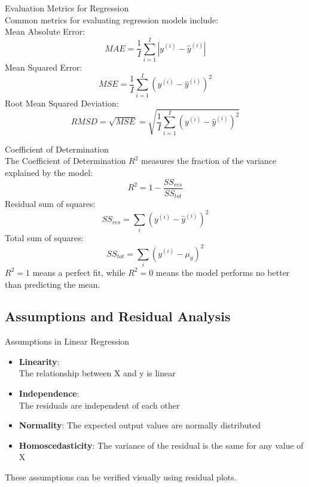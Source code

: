 
\begin{theorem}{Evaluation Metrics for Regression}\\
Common metrics for evaluating regression models include:\\
    Mean Absolute Error: 
    $$MAE = \frac{1}{I} \sum_{i=1}^{I} |y^{(i)}-\hat{y}^{(i)}|$$
    Mean Squared Error: 
    $$MSE = \frac{1}{I}\sum_{i=1}^{I}(y^{(i)}-\hat{y}^{(i)})^2$$
    Root Mean Squared Deviation: 
    $$RMSD = \sqrt{MSE} = \sqrt{\frac{1}{I}\sum_{i=1}^{I}(y^{(i)}-\hat{y}^{(i)})^2}$$
\end{theorem}

\begin{theorem}{Coefficient of Determination}\\
The Coefficient of Determination $R^2$ measures the fraction of the variance explained by the model:
\[R^2 = 1 - \frac{SS_{res}}{SS_{tot}}\]
Residual sum of squares:
$$SS_{res} = \sum_i (y^{(i)} - \hat{y}^{(i)})^2$$
Total sum of squares:
$$SS_{tot} = \sum_i (y^{(i)} - \mu_y)^2$$
$R^2 = 1$ means a perfect fit, while $R^2 = 0$ means the model performs no better than predicting the mean.
\end{theorem}

\multend

\subsection{Assumptions and Residual Analysis}

\begin{concept}{Assumptions in Linear Regression}
\begin{itemize}
    \item \textbf{Linearity}: \\The relationship between X and y is linear
    \item \textbf{Independence}: \\The residuals are independent of each other
    \item \textbf{Normality}: The expected output values are normally distributed
    \item \textbf{Homoscedasticity}: The variance of the residual is the same for any value of X
\end{itemize}
These assumptions can be verified visually using residual plots.
\end{concept}

